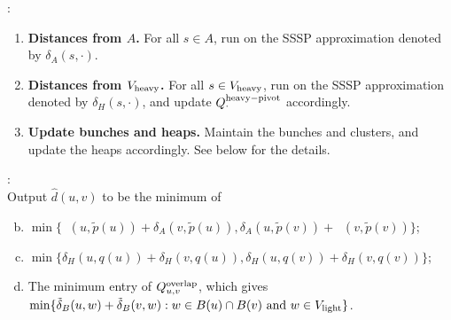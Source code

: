 \documentclass[11pt]{article}
\theoremstyle{definition}
\theoremstyle{remark}
\DeclareMathOperator{\dLNbunch}{\delta_{\tilde{B}}}
\begin{document}
\begin{titlepage}
\noindent{}:
\begin{enumerate}[(1)]
     \item \textbf{Distances from $A$.} For all $s\in A$, run  on the SSSP approximation denoted by $\delta_A(s,\cdot)$. %
    \item \textbf{Distances from $V_{\rm{heavy}}$.} For all $s\in V_{\rm{heavy}}$, run  on the SSSP approximation denoted by $\delta_H(s,\cdot)$, and update $Q^{\rm{heavy-pivot}}_{\cdot}$ accordingly. 
    \item \textbf{Update bunches and heaps.} Maintain the bunches and clusters, and update the heaps accordingly. See below for the details.  \label{step:update3_moved}
\end{enumerate}

\noindent{}:\\
    Output $\hat d(u, v)$ to be the minimum of 
    \begin{enumerate}[(a)]\setcounter{enumi}{1}
         \item $\min\{ \dLNbunch(u,\tilde p(u))+\delta_A(v,\tilde p(u)),\delta_A(u,\tilde p(v))+\dLNbunch(v,\tilde p(v))\}$;\label{step:pivotW}
        \item $\min\{ \delta_H(u,q(u))+\delta_H(v,q(u)),\delta_H(u,q(v))+\delta_H(v,q(v))\}$;\label{step:quvitW}
        \item The minimum entry of $Q^{\rm{overlap}}_{u,v}$, which gives $\min\{\tilde \delta_B(u,w)+\tilde \delta_B(v,w) : w\in B(u)\cap B(v) \text{ and }w\in V_{\rm{light}}\}$. \label{step:w_light} 
    \end{enumerate}
    

\end{titlepage}
\end{document}
